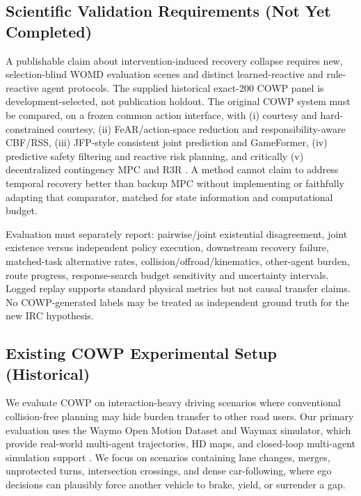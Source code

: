 \documentclass[10pt]{article}
\begin{document}
\subsection{Scientific Validation Requirements (Not Yet Completed)}
\label{sec:validation_req}
A publishable claim about intervention-induced recovery collapse requires new, selection-blind WOMD evaluation scenes and distinct learned-reactive and rule-reactive agent protocols. The supplied historical exact-200 COWP panel is development-selected, not publication holdout. The original COWP system must be compared, on a frozen common action interface, with (i) courtesy and hard-constrained courtesy, (ii) FeAR/action-space reduction and responsibility-aware CBF/RSS, (iii) JFP-style consistent joint prediction and GameFormer, (iv) predictive safety filtering and reactive risk planning, and critically (v) decentralized contingency MPC \parencite{studt2026decentralized} and R3R \parencite{vielmetti2026r3r}. A method cannot claim to address temporal recovery better than backup MPC without implementing or faithfully adapting that comparator, matched for state information and computational budget.

Evaluation must separately report: pairwise/joint existential disagreement, joint existence versus independent policy execution, downstream recovery failure, matched-task alternative rates, collision/offroad/kinematics, other-agent burden, route progress, response-search budget sensitivity and uncertainty intervals. Logged replay supports standard physical metrics but not causal transfer claims. No COWP-generated labels may be treated as independent ground truth for the new IRC hypothesis.

\subsection{Existing COWP Experimental Setup (Historical)}
\label{sec:exp_setup}

We evaluate COWP on interaction-heavy driving scenarios where conventional collision-free planning may hide burden transfer to other road users. Our primary evaluation uses the Waymo Open Motion Dataset and Waymax simulator, which provide real-world multi-agent trajectories, HD maps, and closed-loop multi-agent simulation support \cite{ettinger2021large, gulino2023waymax}. We focus on scenarios containing lane changes, merges, unprotected turns, intersection crossings, and dense car-following, where ego decisions can plausibly force another vehicle to brake, yield, or surrender a gap.
\end{document}
